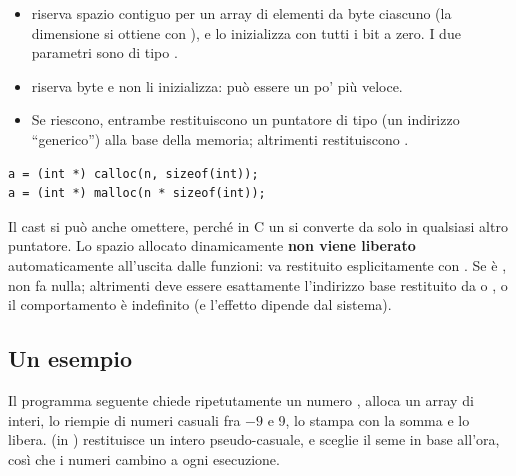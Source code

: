 \begin{itemize}
  \item {} riserva spazio contiguo per un array di
         elementi da  byte ciascuno (la dimensione
        si ottiene con ), e lo inizializza con tutti i bit a
        zero. I due parametri sono di tipo .
  \item {} riserva  byte e non li inizializza:
        può essere un po' più veloce.
  \item Se riescono, entrambe restituiscono un puntatore di tipo
         (un indirizzo “generico”) alla base della memoria;
        altrimenti restituiscono .
\end{itemize}

\begin{lstlisting}[style=c]
a = (int *) calloc(n, sizeof(int));
a = (int *) malloc(n * sizeof(int));
\end{lstlisting}

Il cast  si può anche omettere, perché in C un
 si converte da solo in qualsiasi altro puntatore. Lo spazio
allocato dinamicamente \textbf{non viene liberato} automaticamente
all'uscita dalle funzioni: va restituito esplicitamente con .
Se  è ,  non fa nulla; altrimenti
 deve essere esattamente l'indirizzo base restituito da
 o , o il comportamento è indefinito (e l'effetto
dipende dal sistema).

\subsection{Un esempio}

Il programma seguente chiede ripetutamente un numero , alloca un
array di  interi, lo riempie di numeri casuali fra $-9$ e 9, lo
stampa con la somma e lo libera.  (in )
restituisce un intero pseudo-casuale, e  sceglie il
seme in base all'ora, così che i numeri cambino a ogni esecuzione.


